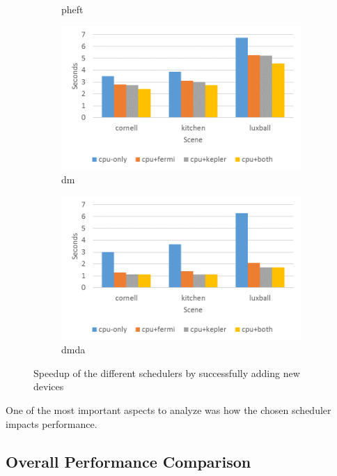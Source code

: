 \documentclass[main.tex]{subfiles}
\begin{document}
\begin{figure}[!htp]
\begin{subfigure}{.5\textwidth}
    \caption{pheft \label{fig:prof:starpu_sched_pheft}}
  \end{subfigure}
  \begin{subfigure}{.5\textwidth}
    \centering
    \includegraphics[width=\linewidth]{profiling/starpu_sched_dm}
    \caption{dm \label{fig:prof:starpu_sched_dm}}
  \end{subfigure}%
  \begin{subfigure}{.5\textwidth}
    \centering
    \includegraphics[width=\linewidth]{profiling/starpu_sched_dmda}
    \caption{dmda \label{fig:prof:starpu_sched_dmda}}
  \end{subfigure}
  \caption{Speedup of the different schedulers by successfully adding new devices \label{fig:prof:starpu_scheds}}
\end{figure}

One of the most important aspects to analyze was how the chosen scheduler impacts performance.

\subsection{Overall Performance Comparison}
\end{document}
